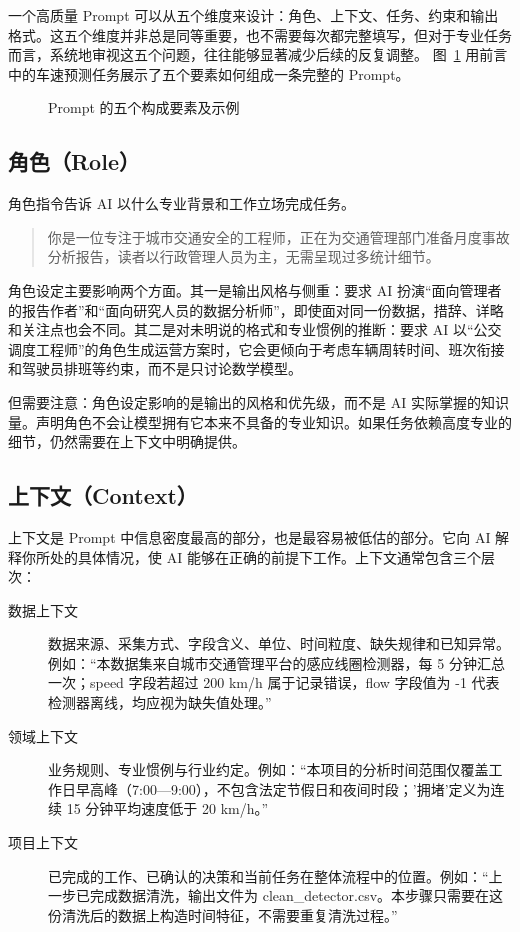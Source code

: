一个高质量 Prompt 可以从五个维度来设计：角色、上下文、任务、约束和输出格式。这五个维度并非总是同等重要，也不需要每次都完整填写，但对于专业任务而言，系统地审视这五个问题，往往能够显著减少后续的反复调整。
图~\ref{fig:ch02_five} 用前言中的车速预测任务展示了五个要素如何组成一条完整的 Prompt。

\begin{figure}[H]
  \centering
  \caption{Prompt 的五个构成要素及示例}
  \label{fig:ch02_five}
\end{figure}

\subsection{角色（Role）}

角色指令告诉 AI 以什么专业背景和工作立场完成任务。

\begin{quote}
你是一位专注于城市交通安全的工程师，正在为交通管理部门准备月度事故分析报告，读者以行政管理人员为主，无需呈现过多统计细节。
\end{quote}

角色设定主要影响两个方面。其一是输出风格与侧重：要求 AI 扮演“面向管理者的报告作者”和“面向研究人员的数据分析师”，即使面对同一份数据，措辞、详略和关注点也会不同。其二是对未明说的格式和专业惯例的推断：要求 AI 以“公交调度工程师”的角色生成运营方案时，它会更倾向于考虑车辆周转时间、班次衔接和驾驶员排班等约束，而不是只讨论数学模型。

但需要注意：角色设定影响的是输出的风格和优先级，而不是 AI 实际掌握的知识量。声明角色不会让模型拥有它本来不具备的专业知识。如果任务依赖高度专业的细节，仍然需要在上下文中明确提供。

\subsection{上下文（Context）}

上下文是 Prompt 中信息密度最高的部分，也是最容易被低估的部分。它向 AI 解释你所处的具体情况，使 AI 能够在正确的前提下工作。上下文通常包含三个层次：

\begin{description}
  \item[数据上下文] 数据来源、采集方式、字段含义、单位、时间粒度、缺失规律和已知异常。例如：“本数据集来自城市交通管理平台的感应线圈检测器，每 5 分钟汇总一次；speed 字段若超过 200 km/h 属于记录错误，flow 字段值为 -1 代表检测器离线，均应视为缺失值处理。”
  \item[领域上下文] 业务规则、专业惯例与行业约定。例如：“本项目的分析时间范围仅覆盖工作日早高峰（7:00—9:00），不包含法定节假日和夜间时段；'拥堵'定义为连续 15 分钟平均速度低于 20 km/h。”
  \item[项目上下文] 已完成的工作、已确认的决策和当前任务在整体流程中的位置。例如：“上一步已完成数据清洗，输出文件为 clean\_detector.csv。本步骤只需要在这份清洗后的数据上构造时间特征，不需要重复清洗过程。”
\end{description}


